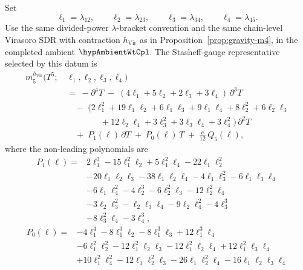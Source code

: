\begin{proposition}%
\label{prop:gravity-m5}
Set
\[
\ell_1=\lambda_{12},\qquad
\ell_2=\lambda_{23},\qquad
\ell_3=\lambda_{34},\qquad
\ell_4=\lambda_{45}.
\]
Use the same divided-power \(\lambda\)-bracket convention and the same
chain-level Virasoro SDR with contraction \(h_{\mathrm{Vir}}\) as in
Proposition~\ref{prop:gravity-m4}, in the completed ambient
\(\hypAmbientWtCpl\).  The Stasheff-gauge representative selected by
this datum is
\begin{equation}\label{eq:gravity-m5}
\begin{aligned}
m_5^{h_{\mathrm{Vir}}}(T^5;\,
 &\ell_1,\ell_2,\ell_3,\ell_4)
\\[3pt]
&=\;
-\partial^4 T
\;-\;
(4\ell_1 + 5\ell_2
 + 2\ell_3 + 3\ell_4)\,\partial^3 T
\\[3pt]
&\quad -\;
(2\ell_1^2 + 19\ell_1\ell_2
 + 6\ell_1\ell_3 + 9\ell_1\ell_4
 + 8\ell_2^2 + 6\ell_2\ell_3
\\
&\qquad\qquad
 + 12\ell_2\ell_4
 + 3\ell_3^2
 + 3\ell_3\ell_4
 + 3\ell_4^2)\,\partial^2 T
\\[3pt]
&\quad +\; P_1(\ell)\,\partial T
\;+\; P_0(\ell)\, T
\;+\; \frac{c}{12}\, Q_5(\ell),
\end{aligned}
\end{equation}
where the non-leading polynomials are
\[
\begin{aligned}
P_1(\ell)={}&
2\ell_1^3 - 15\ell_1^2\ell_2 + 5\ell_1^2\ell_4
- 22\ell_1\ell_2^2
\\
&- 20\ell_1\ell_2\ell_3 - 38\ell_1\ell_2\ell_4
- 4\ell_1\ell_3^2 - 6\ell_1\ell_3\ell_4
\\
&- 6\ell_1\ell_4^2 - 4\ell_2^3 - 6\ell_2^2\ell_3
- 12\ell_2^2\ell_4
\\
&- 3\ell_2\ell_3^2 - \ell_2\ell_3\ell_4
- 9\ell_2\ell_4^2 - 4\ell_3^3
\\
&- 8\ell_3^2\ell_4 - 3\ell_4^3,
\end{aligned}
\]
\[
\begin{aligned}
P_0(\ell)={}&
-4\ell_1^4 - 8\ell_1^3\ell_2 - 8\ell_1^3\ell_3
+ 12\ell_1^3\ell_4
\\
&- 6\ell_1^2\ell_2^2 - 12\ell_1^2\ell_2\ell_3
- 12\ell_1^2\ell_2\ell_4 + 12\ell_1^2\ell_3\ell_4
\\
&+ 10\ell_1^2\ell_4^2 - 12\ell_1\ell_2^2\ell_3
- 26\ell_1\ell_2^2\ell_4 - 16\ell_1\ell_2\ell_3\ell_4

\end{aligned}\]
\end{proposition}
